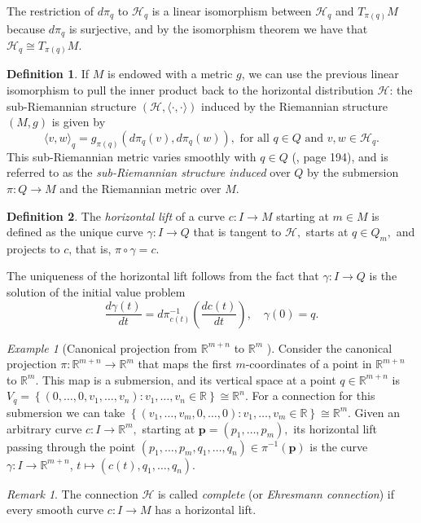 \documentclass[12pt, letterpaper, reqno]{amsart}
\theoremstyle{definition}
\newtheorem{df}{Definition}
\theoremstyle{plain}
\theoremstyle{remark}
\newtheorem{ex}{Example}
\newtheorem{rem}{Remark}
\begin{document}
The restriction of $ d\pi_q $ to $ \mathcal{H}_q $ is a linear isomorphism between $ \mathcal{H}_q $ and $ T_{\pi(q)} M $  because $ d\pi_q $ is surjective, and by the isomorphism theorem we have that $ \mathcal{H}_q\cong T_{\pi(q)} M $. 

\begin{df}\label{df:ind_sub_struc}
If $ M $ is endowed with a metric $ g $, we can use the previous linear isomorphism to pull the inner product back to the horizontal distribution $ \mathcal{H}$: the sub-Riemannian structure $ (\mathcal{H},\langle \cdot, \cdot\rangle) $ induced by the Riemannian structure $ (M,g) $ is given by
$$ \langle v,w \rangle_q = g_{\pi(q)} \left( d\pi_q(v), d\pi_q(w) \right), \text{ for all }q\in Q \text{ and } v,w\in \mathcal{H}_q.   $$ 
This sub-Riemannian metric varies smoothly with $ q\in Q $ (\cite{montgomery2002tour}, page 194), and is referred to as the \textit{sub-Riemannian structure induced} over $ Q $ by the submersion $ \pi: Q \rightarrow M $ and the Riemannian metric over $ M. $ 
\end{df}
\begin{df}
	The \textit{horizontal lift} of a curve $ c: I \rightarrow {M} $ starting at $ m\in M $ is defined as the unique curve $ \gamma : I \rightarrow {Q} $ that is tangent to $ \mathcal{H}, $ starts at $ q\in Q_m, $ and projects to $c$, that is, $ \pi\circ\gamma = c. $ 
\end{df}

The uniqueness of the horizontal lift follows from the fact that $ \gamma: I \rightarrow Q $ is the solution of the initial value problem
$$ \frac{d\gamma(t)}{dt} = d\pi^{-1}_{c(t)} \left( \frac{dc(t)}{dt}  \right),\quad \gamma(0)=q.  $$ 
\begin{ex}[Canonical projection from $ \mathbb{R}^{m+n} $ to $ \mathbb{R}^m $  ]\label{ex:can_proj}
	\sloppy	Consider the canonical projection $ \pi: \mathbb{R}^{m+n} \rightarrow \mathbb{R}^m $ that maps the first $ m $-coordinates of a point in $ \mathbb{R}^{m+n} $  to $ \mathbb{R}^m. $ This map is a submersion, and its vertical space at a point $ q\in \mathbb{R}^{m+n} $ is $ V_q = \left\{ (0,\dots,0,v_1,\dots,v_n) : v_1,\dots,v_n\in \mathbb{R}  \right\} \cong \mathbb{R}^n. $ For a connection for this submersion we can take $ \left\{ (v_1,\dots,v_m, 0,\dots, 0): v_1,\dots,v_m\in \mathbb{R} \right\}\cong \mathbb{R}^m.  $ Given an arbitrary curve $ c: I \rightarrow \mathbb{R}^m, $ starting at $ \boldsymbol{p}= (p_1,\dots,p_m), $ its horizontal lift passing through the point $ (p_1,\dots,p_m,q_1,\dots,q_n)\in \pi^{-1}( \boldsymbol{p} ) $ is the curve $ \gamma: I \rightarrow \mathbb{R}^{m+n} $, $ t\mapsto (c(t),q_1,\dots,q_n). $   
\end{ex}
\begin{rem}
	The connection $ \mathcal{H} $ is called \textit{complete} (or \textit{Ehresmann connection})  if every smooth curve $ c: I \rightarrow {M} $ has a horizontal lift.
\end{rem}
\end{document}
